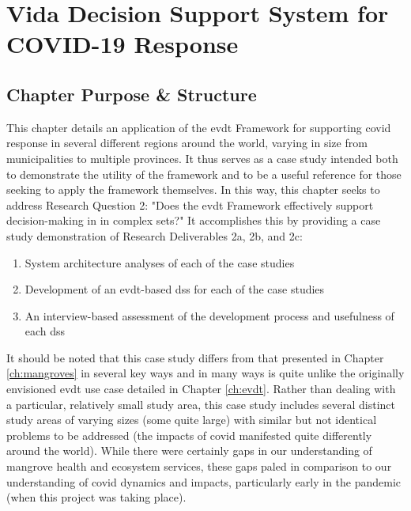 \chapter{Vida Decision Support System for COVID-19 Response} \label{ch:vida}


\section{Chapter Purpose \& Structure} \label{sec:vida-purpose}

This chapter details an application of the \acf{evdt} Framework for supporting \acf{covid} response in several different regions around the world, varying in size from municipalities to multiple provinces. It thus serves as a case study intended both to demonstrate the utility of the framework and to be a useful reference for those seeking to apply the framework themselves. In this way, this chapter seeks to address Research Question 2: "Does the \ac{evdt} Framework effectively support decision-making in in complex \acf{sets}?" It accomplishes this by providing a case study demonstration of Research Deliverables 2a, 2b, and 2c: 

\begin{enumerate}[label=\emph{\alph*},itemsep=0pt,parsep=0pt]
	\item{System architecture analyses of each of the case studies} 
	\item{Development of an \ac{evdt}-based \acf{dss} for each of the case studies} 
	\item{An interview-based assessment of the development process and usefulness of each \ac{dss}} 
\end{enumerate}

It should be noted that this case study differs from that presented in Chapter \ref{ch:mangroves} in several key ways and in many ways is quite unlike the originally envisioned \ac{evdt} use case detailed in Chapter \ref{ch:evdt}. Rather than dealing with a particular, relatively small study area, this case study includes several distinct study areas of varying sizes (some quite large) with similar but not identical problems to be addressed (the impacts of \ac{covid} manifested quite differently around the world). While there were certainly gaps in our understanding of mangrove health and ecosystem services, these gaps paled in comparison to our understanding of \ac{covid} dynamics and impacts, particularly early in the pandemic (when this project was taking place). 

